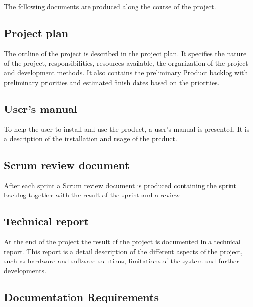 The following documents are produced along the course of the project.

\subsection{Project plan}
The outline of the project is described in the project plan. It specifies the nature of the project, responsibilities, resources available, the organization of the project and development methods. It also contains the preliminary Product backlog with preliminary priorities and estimated finish dates based on the priorities.

\subsection{User's manual}
To help the user to install and use the product, a user's manual is presented. It is a description of the installation and usage of the product.

\subsection{Scrum review document}
After each sprint a Scrum review document is produced containing the sprint backlog together with the result of the sprint and a review.

\subsection{Technical report}
At the end of the project the result of the project is documented in a technical report. This report is a detail description of the different aspects of the project, such as hardware and software solutions, limitations of the system and further developments.

\subsection{Documentation Requirements}
\label{sec:documentation_req}
\reqtable
{
	
}
